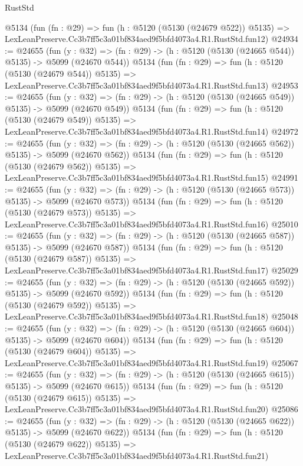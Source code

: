 \begin{lexlean}{RustStd}
\begin{coremodule}
    @5134
    (fun (fn : @29) =>
    fun (h : @5120 (@5130 (@24679 @522)) @5135) =>
    LexLeanPreserve.Cc3b7ff5c3a01bf834aed9f5bfd4073a4.R1.RustStd.fun12)
@24934 := @24655
    (fun (y : @32) => (fn : @29) -> (h : @5120 (@5130 (@24665 @544)) @5135) -> @5099 (@24670 @544))
    @5134
    (fun (fn : @29) =>
    fun (h : @5120 (@5130 (@24679 @544)) @5135) =>
    LexLeanPreserve.Cc3b7ff5c3a01bf834aed9f5bfd4073a4.R1.RustStd.fun13)
@24953 := @24655
    (fun (y : @32) => (fn : @29) -> (h : @5120 (@5130 (@24665 @549)) @5135) -> @5099 (@24670 @549))
    @5134
    (fun (fn : @29) =>
    fun (h : @5120 (@5130 (@24679 @549)) @5135) =>
    LexLeanPreserve.Cc3b7ff5c3a01bf834aed9f5bfd4073a4.R1.RustStd.fun14)
@24972 := @24655
    (fun (y : @32) => (fn : @29) -> (h : @5120 (@5130 (@24665 @562)) @5135) -> @5099 (@24670 @562))
    @5134
    (fun (fn : @29) =>
    fun (h : @5120 (@5130 (@24679 @562)) @5135) =>
    LexLeanPreserve.Cc3b7ff5c3a01bf834aed9f5bfd4073a4.R1.RustStd.fun15)
@24991 := @24655
    (fun (y : @32) => (fn : @29) -> (h : @5120 (@5130 (@24665 @573)) @5135) -> @5099 (@24670 @573))
    @5134
    (fun (fn : @29) =>
    fun (h : @5120 (@5130 (@24679 @573)) @5135) =>
    LexLeanPreserve.Cc3b7ff5c3a01bf834aed9f5bfd4073a4.R1.RustStd.fun16)
@25010 := @24655
    (fun (y : @32) => (fn : @29) -> (h : @5120 (@5130 (@24665 @587)) @5135) -> @5099 (@24670 @587))
    @5134
    (fun (fn : @29) =>
    fun (h : @5120 (@5130 (@24679 @587)) @5135) =>
    LexLeanPreserve.Cc3b7ff5c3a01bf834aed9f5bfd4073a4.R1.RustStd.fun17)
@25029 := @24655
    (fun (y : @32) => (fn : @29) -> (h : @5120 (@5130 (@24665 @592)) @5135) -> @5099 (@24670 @592))
    @5134
    (fun (fn : @29) =>
    fun (h : @5120 (@5130 (@24679 @592)) @5135) =>
    LexLeanPreserve.Cc3b7ff5c3a01bf834aed9f5bfd4073a4.R1.RustStd.fun18)
@25048 := @24655
    (fun (y : @32) => (fn : @29) -> (h : @5120 (@5130 (@24665 @604)) @5135) -> @5099 (@24670 @604))
    @5134
    (fun (fn : @29) =>
    fun (h : @5120 (@5130 (@24679 @604)) @5135) =>
    LexLeanPreserve.Cc3b7ff5c3a01bf834aed9f5bfd4073a4.R1.RustStd.fun19)
@25067 := @24655
    (fun (y : @32) => (fn : @29) -> (h : @5120 (@5130 (@24665 @615)) @5135) -> @5099 (@24670 @615))
    @5134
    (fun (fn : @29) =>
    fun (h : @5120 (@5130 (@24679 @615)) @5135) =>
    LexLeanPreserve.Cc3b7ff5c3a01bf834aed9f5bfd4073a4.R1.RustStd.fun20)
@25086 := @24655
    (fun (y : @32) => (fn : @29) -> (h : @5120 (@5130 (@24665 @622)) @5135) -> @5099 (@24670 @622))
    @5134
    (fun (fn : @29) =>
    fun (h : @5120 (@5130 (@24679 @622)) @5135) =>
    LexLeanPreserve.Cc3b7ff5c3a01bf834aed9f5bfd4073a4.R1.RustStd.fun21)

\end{coremodule}
\end{lexlean}
